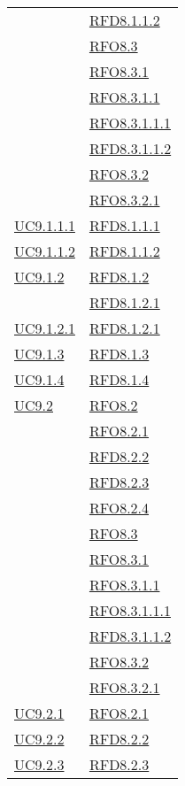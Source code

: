 \begin{longtable}{|>{\centering}m{5cm}|m{5cm}<{\centering}|}
& \hyperlink{RFD8.1.1.2}{RFD8.1.1.2}\\
& \hyperlink{RFO8.3}{RFO8.3}\\
& \hyperlink{RFO8.3.1}{RFO8.3.1}\\
& \hyperlink{RFO8.3.1.1}{RFO8.3.1.1}\\
& \hyperlink{RFO8.3.1.1.1}{RFO8.3.1.1.1}\\
& \hyperlink{RFD8.3.1.1.2}{RFD8.3.1.1.2}\\
& \hyperlink{RFO8.3.2}{RFO8.3.2}\\
& \hyperlink{RFO8.3.2.1}{RFO8.3.2.1}\\ \hline
\hyperref[UC9.1.1.1]{UC9.1.1.1} & \hyperlink{RFD8.1.1.1}{RFD8.1.1.1}\\ \hline
\hyperref[UC9.1.1.2]{UC9.1.1.2} & \hyperlink{RFD8.1.1.2}{RFD8.1.1.2}\\ \hline
\hyperref[UC9.1.2]{UC9.1.2} & \hyperlink{RFD8.1.2}{RFD8.1.2}\\
& \hyperlink{RFD8.1.2.1}{RFD8.1.2.1}\\ \hline
\hyperref[UC9.1.2.1]{UC9.1.2.1} & \hyperlink{RFD8.1.2.1}{RFD8.1.2.1}\\ \hline
\hyperref[UC9.1.3]{UC9.1.3} & \hyperlink{RFD8.1.3}{RFD8.1.3}\\ \hline
\hyperref[UC9.1.4]{UC9.1.4} & \hyperlink{RFD8.1.4}{RFD8.1.4}\\ \hline
\hyperref[UC9.2]{UC9.2} & \hyperlink{RFO8.2}{RFO8.2}\\
& \hyperlink{RFO8.2.1}{RFO8.2.1}\\
& \hyperlink{RFD8.2.2}{RFD8.2.2}\\
& \hyperlink{RFD8.2.3}{RFD8.2.3}\\
& \hyperlink{RFO8.2.4}{RFO8.2.4}\\
& \hyperlink{RFO8.3}{RFO8.3}\\
& \hyperlink{RFO8.3.1}{RFO8.3.1}\\
& \hyperlink{RFO8.3.1.1}{RFO8.3.1.1}\\
& \hyperlink{RFO8.3.1.1.1}{RFO8.3.1.1.1}\\
& \hyperlink{RFD8.3.1.1.2}{RFD8.3.1.1.2}\\
& \hyperlink{RFO8.3.2}{RFO8.3.2}\\
& \hyperlink{RFO8.3.2.1}{RFO8.3.2.1}\\ \hline
\hyperref[UC9.2.1]{UC9.2.1} & \hyperlink{RFO8.2.1}{RFO8.2.1}\\ \hline
\hyperref[UC9.2.2]{UC9.2.2} & \hyperlink{RFD8.2.2}{RFD8.2.2}\\ \hline
\hyperref[UC9.2.3]{UC9.2.3} & \hyperlink{RFD8.2.3}{RFD8.2.3}\\ \hline

\end{longtable}
